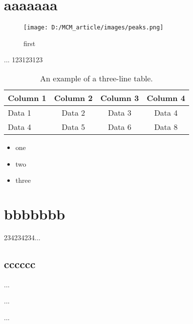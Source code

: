 \documentclass{HZNUMCM}
\begin{document}
\showSummarySheet
\showContents

  \section{aaaaaaa}
  \begin{figure}[h]
    \centering
    \texttt{[image: D:/MCM\_article/images/peaks.png]} %
    \caption{first}
    \label{fig:image1}
  \end{figure}

  ...\cite{example1}
  123123123\cite{rosenow1983drought}
  \begin{table}[h]
    \centering
    \begin{tabular}{lccc}
      \toprule
      Column 1 & Column 2 & Column 3 & Column 4 \\
      \midrule
      Data 1 & Data 2 & Data 3 & Data 4 \\
      Data 4 & Data 5 & Data 6 & Data 8 \\
      \bottomrule
    \end{tabular}
    \caption{An example of a three-line table.}
    \label{tab:example}
  \end{table}

  \begin{itemize}
    \item one
    \item two
    \item three
  \end{itemize}



  \section{bbbbbbb}
  234234234...\cite{example1}
    \subsection{cccccc}

...

...

...

  
\end{document}
